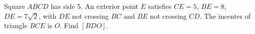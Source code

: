 Square $ ABCD $ has side 5. An exterior point $ E $ satisfies $ CE=5 $, $ BE=8 $, $ DE=7\sqrt2 $, with $ DE $ not crossing $ BC $ and $ BE $ not crossing $ CD $. The incenter of triangle $ BCE $ is $ O $. Find $[BDO]$.
